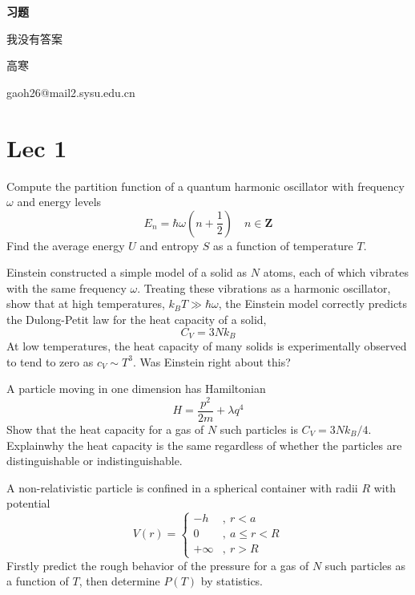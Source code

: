 \documentclass[CJK]{beamer}
\author{}
\date{}
\begin{document}
\begin{frame}
 
\begin{center}
\bch
\begin{Large}
{\bf \LARGE 习题}

\skipline
{\small 我没有答案}


\end{Large}
\skipline

高寒   


gaoh26@mail2.sysu.edu.cn 

\ech
\end{center}
\end{frame}


\section{Lec 1}

\begin{frame}
\bch
Compute the partition function of a quantum harmonic oscillator with frequency $\omega$
and energy levels$$E_{n}=\hbar \omega\left(n+\frac{1}{2}\right) \quad n \in \mathbf{Z}$$
Find the average energy $U$ and entropy $S$ as a function of temperature $T$.\par

\ech
\end{frame}

\begin{frame}
\bch
Einstein constructed a simple model of a solid as $N$ atoms, each of which vibrates with
the same frequency $\omega$. Treating these vibrations as a harmonic oscillator, show that at
high temperatures, $k_B T \gg \hbar \omega$, the Einstein model correctly predicts the Dulong-Petit
law for the heat capacity of a solid, $$C_V = 3Nk_B$$ At low temperatures, the heat capacity of many solids is experimentally observed to
tend to zero as $c_V \sim T^3$. Was Einstein right about this?
\ech
\end{frame}

\begin{frame}
\bch
A particle moving in one dimension has Hamiltonian $$H=\frac{p^{2}}{2 m}+\lambda q^{4}$$ Show that the heat capacity for a gas of $N$ such particles is $C_V = 3Nk_B/4$. Explainwhy the heat capacity is the same regardless of whether the particles are distinguishable or indistinguishable.
\ech
\end{frame}

\begin{frame}
\bch
A non-relativistic particle is confined in a spherical container with radii $R$ with potential$$ V(r) = \begin{cases} -h&,\ r<a \\ 0 &,\ a\leq r <R \\ +\infty &,\ r>R\end{cases}$$
Firstly predict the rough behavior of the pressure for a gas of $N$ such particles as a function of $T$, then determine $P(T)$ by statistics.
\ech
\end{frame}
\end{document}
